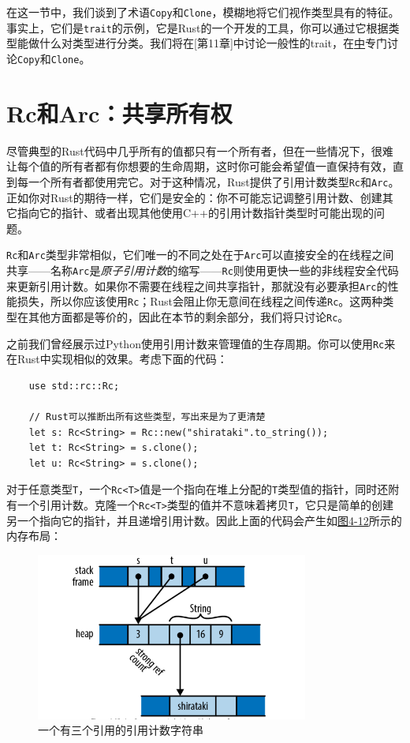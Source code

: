 在这一节中，我们谈到了术语\texttt{Copy}和\texttt{Clone}，模糊地将它们视作类型具有的特征。事实上，它们是\texttt{trait}的示例，它是Rust的一个开发的工具，你可以通过它根据类型能做什么对类型进行分类。我们将在\hyperref[ch11][第11章]中讨论一般性的trait，在\hyperref[ch13]中专门讨论\texttt{Copy}和\texttt{Clone}。

\section{Rc和Arc：共享所有权}\label{rc}

尽管典型的Rust代码中几乎所有的值都只有一个所有者，但在一些情况下，很难让每个值的所有者都有你想要的生命周期，这时你可能会希望值一直保持有效，直到每一个所有者都使用完它。对于这种情况，Rust提供了引用计数类型\texttt{Rc}和\texttt{Arc}。正如你对Rust的期待一样，它们是安全的：你不可能忘记调整引用计数、创建其它指向它的指针、或者出现其他使用C++的引用计数指针类型时可能出现的问题。

\texttt{Rc}和\texttt{Arc}类型非常相似，它们唯一的不同之处在于\texttt{Arc}可以直接安全的在线程之间共享——名称\texttt{Arc}是\emph{原子引用计数}的缩写——\texttt{Rc}则使用更快一些的非线程安全代码来更新引用计数。如果你不需要在线程之间共享指针，那就没有必要承担\texttt{Arc}的性能损失，所以你应该使用\texttt{Rc}；Rust会阻止你无意间在线程之间传递\texttt{Rc}。这两种类型在其他方面都是等价的，因此在本节的剩余部分，我们将只讨论\texttt{Rc}。

之前我们曾经展示过Python使用引用计数来管理值的生存周期。你可以使用\texttt{Rc}来在Rust中实现相似的效果。考虑下面的代码：
\begin{verbatim}
    use std::rc::Rc;

    // Rust可以推断出所有这些类型，写出来是为了更清楚
    let s: Rc<String> = Rc::new("shirataki".to_string());
    let t: Rc<String> = s.clone();
    let u: Rc<String> = s.clone();
\end{verbatim}

对于任意类型\texttt{T}，一个\texttt{Rc<T>}值是一个指向在堆上分配的\texttt{T}类型值的指针，同时还附有一个引用计数。克隆一个\texttt{Rc<T>}类型的值并不意味着拷贝\texttt{T}，它只是简单的创建另一个指向它的指针，并且递增引用计数。因此上面的代码会产生如\hyperref[f4-12]{图4-12}所示的内存布局：

\begin{figure}[htbp]
    \centering
    \includegraphics[width=0.8\textwidth]{../img/f4-12.png}
    \caption{一个有三个引用的引用计数字符串}
    \label{f4-12}
\end{figure}

